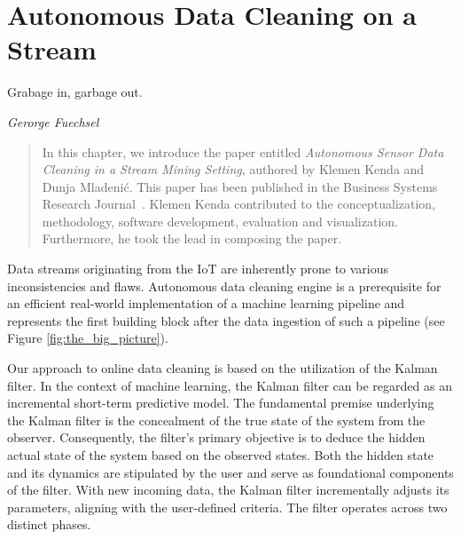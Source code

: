 \chapter{Autonomous Data Cleaning on a Stream}
\label{ch:data-cleaning}

\epigraph{Grabage in, garbage out.}{\textit{Gerorge Fuechsel}}

\begin{quote}
In this chapter, we introduce the paper entitled \textit{Autonomous Sensor Data Cleaning in a Stream Mining Setting}, authored by Klemen Kenda and Dunja Mladenić. 
This paper has been published in the Business Systems Research Journal~\cite{kenda:2018:autonomous}.
Klemen Kenda contributed to the conceptualization, methodology, software development, evaluation and visualization.
Furthermore, he took the lead in composing the paper.
\end{quote}

Data streams originating from the IoT are inherently prone to various inconsistencies and flaws.
Autonomous data cleaning engine is a prerequisite for an efficient real-world implementation of a machine learning pipeline and represents the first building block after the data ingestion of such a pipeline (see Figure \ref{fig:the_big_picture}).

Our approach to online data cleaning is based on the utilization of the Kalman filter. 
In the context of machine learning, the Kalman filter can be regarded as an incremental short-term predictive model.
The fundamental premise underlying the Kalman filter is the concealment of the true state of the system from the observer.
Consequently, the filter's primary objective is to deduce the hidden actual state of the system based on the observed states.
Both the hidden state and its dynamics are stipulated by the user and serve as foundational components of the filter.
With new incoming data, the Kalman filter incrementally adjusts its parameters, aligning with the user-defined criteria. 
The filter operates across two distinct phases.

